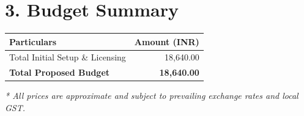\documentclass[12pt,a4paper]{article}
\begin{document}
\section*{3. Budget Summary}
\vspace{0.3cm}
\noindent
\renewcommand{\arraystretch}{1.5}
\begin{tabular}{|p{10cm}|r|}
\hline
\textbf{Particulars} & \textbf{Amount (INR)} \\ \hline
Total Initial Setup \& Licensing & 18,640.00 \\ \hline
\textbf{Total Proposed Budget} & \textbf{18,640.00} \\ \hline
\end{tabular}
\vspace{0.5cm}



\vfill
\begin{center}
    \textit{* All prices are approximate and subject to prevailing exchange rates and local GST.}
\end{center}
\end{document}
